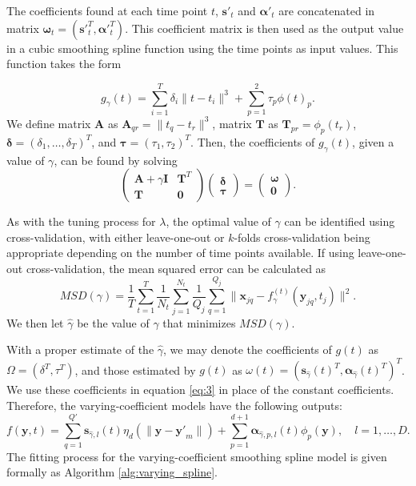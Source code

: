 \documentclass[11pt,reqno]{article}
\theoremstyle{definition}
\begin{document}
The coefficients found at each time point $t$, $\mathbf{s'}_{t}$ and $\mathbf{\alpha'}_{t}$ are concatenated in matrix $\mathbf{\omega}_{t} = \left(\mathbf{s'}_{t}^T, \mathbf{\alpha'}_{t}^T\right)$. This coefficient matrix is then used as the output value in a cubic smoothing spline function using the time points as input values. This function takes the form

\[%
  g_{\gamma}(t) = \sum_{i=1}^{T}\delta_i\|t - t_i\|^{3} + \sum_{p=1}^{2}\tau_p \phi(t)_p
.\]%
We define matrix $\mathbf{A}$ as $\mathbf{A}_{qr} = \|t_q - t_r\|^{3}$, matrix $\mathbf{T}$ as $\mathbf{T}_{pr} = \phi_p(t_r)$, $\mathbf{\delta} = \left(\delta_1, \dots, \delta_T\right)^{T}$, and $\mathbf{\tau} = \left(\tau_1, \tau_2\right)^{T}$. Then, the coefficients of $g_{\gamma}(t)$, given a value of $\gamma$, can be found by solving
\begin{equation}
  \left(
  \begin{array}{cc}
    \mathbf{A} + \gamma\mathbf{I} & \mathbf{T}^{T} \\
    \mathbf{T} & \mathbf{0}
  \end{array}
  \right)\left(
  \begin{array}{c}
    \mathbf{\delta} \\
    \mathbf{\tau}
  \end{array}
  \right) = \left(
  \begin{array}{c}
    \mathbf{\omega} \\
    \mathbf{0}
  \end{array}
  \right). \label{eq:7}
\end{equation}

As with the tuning process for $\lambda$, the optimal value of $\gamma$ can be identified using cross-validation, with either leave-one-out or $k$-folds cross-validation being appropriate depending on the number of time points available. If using leave-one-out cross-validation, the mean squared error can be calculated as
\begin{equation}
  MSD(\gamma) = \frac{1}{T}\sum_{t=1}^{T}\frac{1}{N_t}\sum_{j=1}^{N_t}\frac{1}{Q_j}\sum_{q=1}^{Q_j}\|\mathbf{x}_{jq} - f_{\gamma}^{(t)}(\mathbf{y}_{jq}, t_j)\|^2. \label{eq:8}
\end{equation}
We then let $\hat{\gamma}$ be the value of $\gamma$ that minimizes $MSD(\gamma)$.

With a proper estimate of the $\hat{\gamma}$, we may denote the coefficients of $g(t)$ as $\Omega = \left(\delta^{T}, \tau^{T}\right)$, and those estimated by $g(t)$ as $\omega(t) = \left(\mathbf{s}_{\hat{\gamma}}(t)^{T}, \mathbf{\alpha}_{\hat{\gamma}}(t)^{T}\right)^{T}$. We use these coefficients in equation \ref{eq:3} in place of the constant coefficients. Therefore, the varying-coefficient models have the following outputs:
\begin{equation}
  f(\mathbf{y}, t) = \sum_{q=1}^{Q'}\mathbf{s}_{\hat{\gamma}, l}(t) \eta_{d}\left(\|\mathbf{y} - \mathbf{y'}_m\|\right) + \sum_{p=1}^{d + 1}\mathbf{\alpha}_{\hat{\gamma}, p, l}(t) \phi_p(\mathbf{y}), \quad l = 1, \dots, D. \label{eq:9}
\end{equation}
The fitting process for the varying-coefficient smoothing spline model is given formally as Algorithm \ref{alg:varying_spline}.
\end{document}
